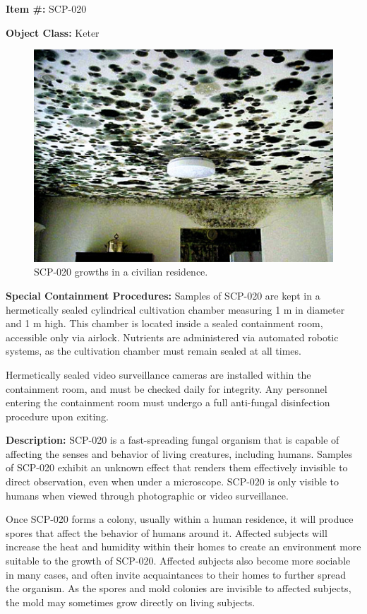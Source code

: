 
\textbf{Item \#:} SCP-020

\textbf{Object Class:} Keter

\begin{figure}[h]
\begin{center}
\includegraphics[scale=0.6]{scp/020a.jpg}
\linebreak SCP-020 growths in a civilian residence.
\end{center}
\end{figure}

\textbf{Special Containment Procedures:} Samples of SCP-020 are kept in a hermetically sealed cylindrical cultivation chamber measuring 1 m in diameter and 1 m high. This chamber is located inside a sealed containment room, accessible only via airlock. Nutrients are administered via automated robotic systems, as the cultivation chamber must remain sealed at all times.

Hermetically sealed video surveillance cameras are installed within the containment room, and must be checked daily for integrity. Any personnel entering the containment room must undergo a full anti-fungal disinfection procedure upon exiting.

\textbf{Description:} SCP-020 is a fast-spreading fungal organism that is capable of affecting the senses and behavior of living creatures, including humans. Samples of SCP-020 exhibit an unknown effect that renders them effectively invisible to direct observation, even when under a microscope. SCP-020 is only visible to humans when viewed through photographic or video surveillance.

Once SCP-020 forms a colony, usually within a human residence, it will produce spores that affect the behavior of humans around it. Affected subjects will increase the heat and humidity within their homes to create an environment more suitable to the growth of SCP-020. Affected subjects also become more sociable in many cases, and often invite acquaintances to their homes to further spread the organism. As the spores and mold colonies are invisible to affected subjects, the mold may sometimes grow directly on living subjects.

